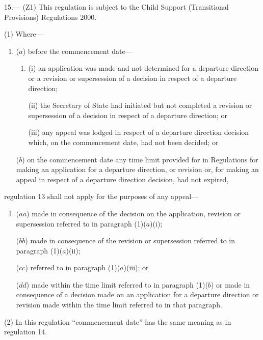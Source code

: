 \documentclass[12pt,a4paper]{article}
\begin{document}

\medskip

15.---%
(Z1) This regulation is subject to the Child Support (Transitional Provisions) Regulations 2000.

(1)  Where—
\begin{enumerate}\item[]
($a$) before the commencement date—
\begin{enumerate}\item[]
(i) an application was made and not determined for a departure direction or a revision or supersession of a decision in respect of a departure direction;

(ii) the Secretary of State had initiated but not completed a revision or supersession of a decision in respect of a departure direction; or

(iii) any appeal was lodged in respect of a departure direction decision which, on the commencement date, had not been decided; or
\end{enumerate}

($b$) on the commencement date any time limit provided for in Regulations for making an application for a departure direction, or revision or, for making an appeal in respect of a departure direction decision, had not expired,
\end{enumerate}
regulation 13 shall not apply for the purposes of any appeal—
\begin{enumerate}\item[]
($aa$) made in consequence of the decision on the application, revision or supersession referred to in paragraph (1)($a$)(i);

($bb$) made in consequence of the revision or supersession referred to in paragraph (1)($a$)(ii);

($cc$) referred to in paragraph (1)($a$)(iii); or

($dd$) made within the time limit referred to in paragraph (1)($b$)  or made in consequence of a decision made on an application for a departure direction or revision made within the time limit referred to in that paragraph.
\end{enumerate}

(2) In this regulation “commencement date” has the same meaning as in regulation 14. 
\end{document}
